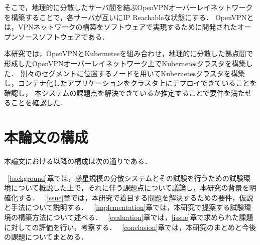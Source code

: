 そこで，地理的に分散したサーバ間を結ぶOpenVPNオーバーレイネットワークを構築することで，各サーバが互いにIP Reachableな状態にする．
OpenVPNとは，VPNネットワークの構築をソフトウェアで実現するために開発されたオープンソースソフトウェアである．

本研究では，OpenVPNとKubernetesを組み合わせ，地理的に分散した拠点間で形成したOpenVPNオーバーレイネットワーク上でKubernetesクラスタを構築した．
別々のセグメントに位置するノードを用いてKubernetesクラスタを構築し，コンテナ化したアプリケーションをクラスタ上にデプロイできていることを確認し，
本システムの課題点を解決できているか推定することで要件を満たせることを確認した．

\section{本論文の構成}
\label{introduction:structure}

本論文における以降の構成は次の通りである．

~\ref{background}章では，惑星規模の分散システムとその試験を行うための試験環境について概説した上で，それに伴う課題点について議論し，本研究の背景を明確化する．
~\ref{issue}章では，本研究で着目する問題を解決するための要件，仮説と手法について説明する．
~\ref{implementation}章では，本研究で提案する試験環境の構築方法について述べる．
~\ref{evaluation}章では，\ref{issue}章で求められた課題に対しての評価を行い，考察する．
~\ref{conclusion}章では，本研究のまとめと今後の課題についてまとめる．

